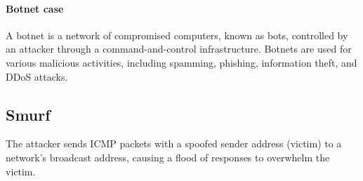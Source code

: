 \paragraph*{Botnet case}
A botnet is a network of compromised computers, known as bots, controlled by an attacker through a command-and-control infrastructure. 
Botnets are used for various malicious activities, including spamming, phishing, information theft, and DDoS attacks.

\subsection{Smurf}
The attacker sends ICMP packets with a spoofed sender address (victim) to a network's broadcast address, causing a flood of responses to overwhelm the victim.